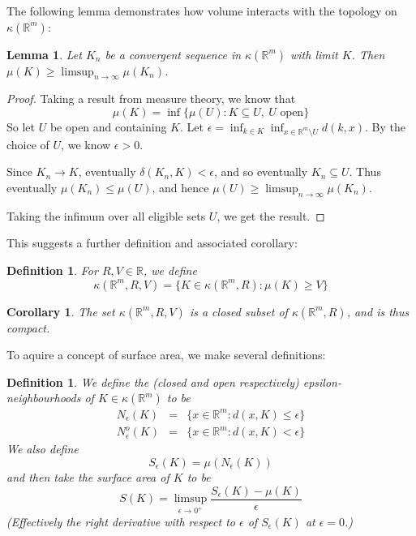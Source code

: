 \documentclass[a4paper,11pt]{article}
\newcommand{\bbR}{\mathbb{R}}
\newtheorem{lemma}[thm]{Lemma}
\newtheorem{corollary}[thm]{Corollary}
\newtheorem{defn}[thm]{Definition}
\begin{document}
The following lemma demonstrates how volume interacts with the topology on
$\kappa(\bbR^m)$:

\begin{lemma}
\label{thm:upperContinuityOfVolume}
Let $K_n$ be a convergent sequence in $\kappa(\bbR^m)$ with limit $K$.  Then
$\mu(K)\geq\limsup_{n\to\infty}\mu(K_n)$.
\end{lemma}

\begin{proof}
Taking a result from measure theory, we know that
\[
\mu(K)=\inf\{\mu(U):K\subseteq U,\ U \textrm{ open}\}
\]
So let $U$ be open and containing $K$.  Let
$\epsilon=\inf_{k\in K}\inf_{x\in\bbR^m\setminus U}d(k,x)$.  By the choice of
$U$, we know $\epsilon>0$.

Since $K_n\to K$, eventually $\delta(K_n,K)<\epsilon$, and so eventually
$K_n\subseteq U$.
Thus eventually $\mu(K_n)\leq\mu(U)$, and hence
$\mu(U)\geq\limsup_{n\to\infty}\mu(K_n)$.

Taking the infimum over all eligible sets $U$, we get the result.
\end{proof}

This suggests a further definition and associated corollary:

\begin{defn}
For $R,V\in\bbR$, we define
\[
\kappa(\bbR^m,R,V)=\{K\in\kappa(\bbR^m,R):\mu(K)\geq V\}
\]
\end{defn}

\begin{corollary}
\label{thm:volumeBoundedSpaces}
The set $\kappa(\bbR^m,R,V)$ is a closed subset of $\kappa(\bbR^m,R)$, and is
thus compact.
\end{corollary}

To aquire a concept of surface area, we make several definitions:

\begin{defn}
We define the (\emph{closed} and \emph{open} respectively)
\emph{epsilon-neighbourhoods} of $K\in\kappa(\bbR^m)$ to be
\begin{eqnarray*}
N_\epsilon(K)&=&\{x\in\bbR^m:d(x,K)\leq \epsilon\} \\
N_\epsilon^o(K)&=&\{x\in\bbR^m:d(x,K)<\epsilon\}
\end{eqnarray*}
We also define
\[
S_\epsilon(K)=\mu(N_\epsilon(K))
\]
and then take the surface area of $K$ to be
\[
S(K)=\limsup_{\epsilon\to0^+}\frac{S_\epsilon(K)-\mu(K)}{\epsilon}
\]
(Effectively the right derivative with respect to $\epsilon$ of $S_\epsilon(K)$
at $\epsilon=0$.)
\end{defn}
\end{document}
